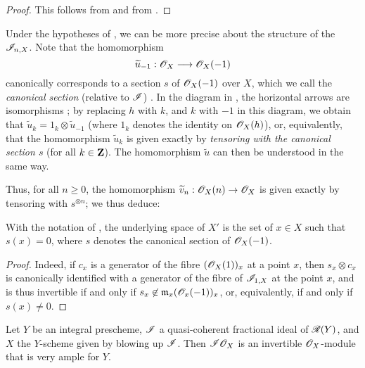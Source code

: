 \begin{proof}
This follows from  and from .
\end{proof}

\begin{env}[8.1.9]
\label{II.8.1.9}
Under the hypotheses of , we can be more precise about the structure of the $\mathscr{I}_{n,X}$.
Note that the homomorphism
\[
  \widetilde{u}_{-1}: \sh{O}_X \to \sh{O}_X(-1)
\]
canonically corresponds to a section $s$ of $\mathscr{O}_X(-1)$ over $X$, which we call the \emph{canonical section} (relative to $\mathscr{I}$) .
In the diagram in , the horizontal arrows are isomorphisms ; by replacing $h$ with $k$, and $k$ with $-1$ in this diagram, we obtain that $\widetilde{u}_k = 1_k \otimes \widetilde{u}_{-1}$ (where $1_k$ denotes the identity on $\mathscr{O}_X(h)$), or, equivalently, that the homomorphism $\widetilde{u}_k$ is given exactly by \emph{tensoring with the canonical section $s$} (for all $k\in\mathbf{Z}$).
The homomorphism $\widetilde{u}$  can then be understood in the same way.

Thus, for all $n\geq0$, the homomorphism $\widetilde{v}_n: \sh{O}_X(n)\to\sh{O}_X$ is given exactly by tensoring with $s^{\otimes n}$;
we thus deduce:
\end{env}

\begin{corollary}[8.1.10]
\label{II.8.1.10}
With the notation of , the underlying space of $X'$ is the set of $x\in X$ such that $s(x)=0$, where $s$ denotes the canonical section of $\mathscr{O}_X(-1)$.
\end{corollary}

\begin{proof}
Indeed, if $c_x$ is a generator of the fibre $(\mathscr{O}_X(1))_x$ at a point $x$, then $s_x\otimes c_x$ is canonically identified with a generator of the fibre of $\mathscr{I}_{1,X}$ at the point $x$, and is thus invertible if and only if $s_x\not\in\mathfrak{m}_x(\mathscr{O}_x(-1))_x$, or, equivalently, if and only if $s(x)\neq0$.
\end{proof}

\begin{proposition}
\label{II.8.1.11}
Let $Y$ be an integral prescheme, $\mathscr{I}$ a quasi-coherent fractional ideal of $\mathscr{R}(Y)$, and $X$ the $Y$-scheme given by blowing up $\mathscr{I}$.
Then $\mathscr{I}\mathscr{O}_X$ is an invertible $\mathscr{O}_X$-module that is very ample for $Y$.
\end{proposition}

